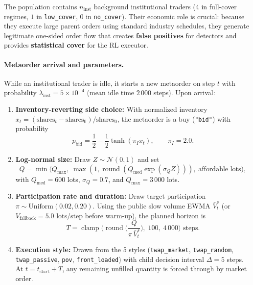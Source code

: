 \documentclass[11pt,a4paper]{article}
\newcommand{\code}[1]{\texttt{#1}}
\newcommand{\clamp}{\operatorname{clamp}}
\begin{document}
The population contains $n_{\text{inst}}$ background institutional traders ($4$ in full-cover regimes,
$1$ in \code{low\_cover}, $0$ in \code{no\_cover}). Their economic role is crucial: because they execute
large parent orders using standard industry schedules, they generate legitimate one-sided order flow that
creates \textbf{false positives} for detectors and provides \textbf{statistical cover} for the RL
executor.

\paragraph{Metaorder arrival and parameters.} While an institutional trader is idle, it starts a new
metaorder on step $t$ with probability $\lambda_{\text{inst}} = 5\times 10^{-4}$ (mean idle time $2\,000$
steps). Upon arrival:
\begin{enumerate}[nosep]
\item \textbf{Inventory-reverting side choice:} With normalized inventory
  $x_t = (\text{shares}_t - \text{shares}_0)/\text{shares}_0$, the metaorder is a buy (\code{"bid"})
  with probability
  \begin{equation}
    p_{\text{bid}} = \frac{1}{2} - \frac{1}{2}\tanh(\pi_I x_t), \qquad \pi_I = 2.0.
  \end{equation}
\item \textbf{Log-normal size:} Draw $Z \sim \mathcal{N}(0,1)$ and set
  \begin{equation}
    Q = \min\!\big(Q_{\max},\; \max(1, \operatorname{round}(Q_{\text{med}} \exp(\sigma_Q Z))),\;
    \text{affordable lots}\big),
  \end{equation}
  with $Q_{\text{med}} = 600$ lots, $\sigma_Q = 0.7$, and $Q_{\max} = 3\,000$ lots.
\item \textbf{Participation rate and duration:} Draw target participation
  $\pi \sim \text{Uniform}(0.02, 0.20)$. Using the public slow volume EWMA $\bar V^s_t$ (or
  $V_{\text{fallback}} = 5.0$ lots/step before warm-up), the planned horizon is
  \begin{equation}
    T = \clamp\!\Big(\operatorname{round}\!\Big(\frac{Q}{\pi\,\bar V^s_t}\Big),\; 100,\; 4\,000\Big)\text{ steps}.
  \end{equation}
\item \textbf{Execution style:} Drawn from the 5 styles (\code{twap\_market}, \code{twap\_random},
  \code{twap\_passive}, \code{pov}, \code{front\_loaded}) with child decision interval $\Delta = 5$ steps.
  At $t = t_{\text{start}} + T$, any remaining unfilled quantity is forced through by market order.
\end{enumerate}
\end{document}
